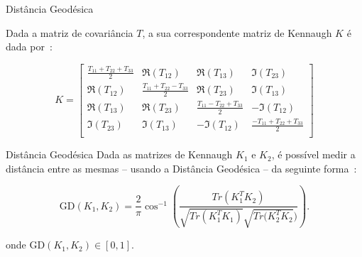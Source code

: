 \documentclass{beamer} %
\begin{document}
\begin{frame}{Distância Geodésica}

Dada a matriz de covariância $T$, a sua correspondente matriz de Kennaugh $K$ é dada por~\cite{ClassificationPolSARGeodesic}:


\scriptsize
\begin{equation}
K =
\begin{bmatrix}
\frac{ T_{11} + T_{22} + T_{33} }{2} & \Re(T_{12}) & \Re(T_{13}) & \Im(T_{23})\\
\Re(T_{12}) & \frac{T_{11} + T_{22} - T_{33}}{2} & \Re(T_{23}) & \Im(T_{13})\\
\Re(T_{13}) & \Re(T_{23}) & \frac{ T_{11} - T_{22} + T_{33} }{2} & -\Im(T_{12})\\
\Im(T_{23}) & \Im(T_{13}) & -\Im(T_{12}) & \frac{ -T_{11} + T_{22} + T_{33} }{2}\\
\end{bmatrix}
\end{equation}

\normalsize
    
\end{frame}

\begin{frame}{Distância Geodésica}
    Dada as matrizes de Kennaugh $K_1$ e $K_2$, é possível medir a distância entre as mesmas -- usando a Distância Geodésica -- da seguinte forma~\cite{ClassificationPolSARGeodesic}:
    
\begin{equation}
\text{GD}(K_1, K_2) = \frac{2}{\pi} \cos^{-1} \left(\frac{Tr(K_1^T K_2)}{\sqrt{Tr(K_1^T K_1)} \sqrt{Tr(K_2^T K_2})} \right).
\end{equation}

onde $\text{GD}(K_1, K_2) \in [0,1]$.
    
\end{frame}
\end{document}
